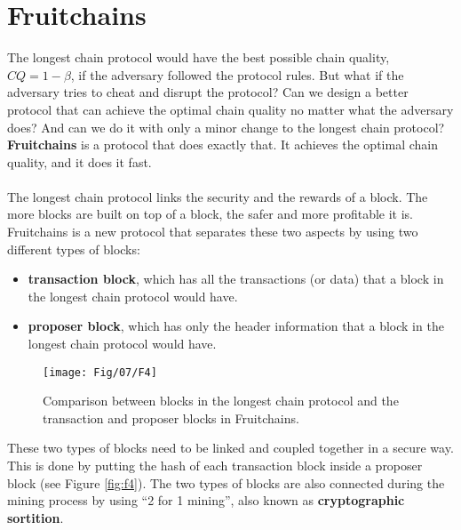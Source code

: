 \section{Fruitchains}
The longest chain protocol would have the best possible chain quality, $CQ = 1 - \beta$, if the adversary followed the protocol rules. But what if the adversary tries to cheat and disrupt the protocol? Can we design a better protocol that can achieve the optimal chain quality no matter what the adversary does? And can we do it with only a minor change to the longest chain protocol?\\ \textbf{Fruitchains} is a protocol that does exactly that. It achieves the optimal chain quality, and it does it fast.\\\\
The longest chain protocol links the security and the rewards of a block. The more blocks are built on top of a block, the safer and more profitable it is. Fruitchains is a new protocol that separates these two aspects by using two different types of blocks:
\begin{itemize}
	\item \textbf{transaction block}, which has all the transactions (or data) that a block in the longest chain protocol would have.
	\item \textbf{proposer block}, which has only the header information that a block in the longest chain protocol would have.
\end{itemize}
\begin{figure}[h!]
	\centering
	\texttt{[image: Fig/07/F4]}
	\caption{Comparison between blocks in the longest chain protocol and the transaction and proposer
		blocks in Fruitchains.}
	\label{fig:l7_f4}
\end{figure}

These two types of blocks need to be linked and coupled together in a secure way. This is done by putting the hash of each transaction block inside a proposer block (see Figure \ref{fig:f4}). The two types of blocks are also connected during the mining process by using “2 for 1 mining”, also known as \textbf{cryptographic sortition}.

